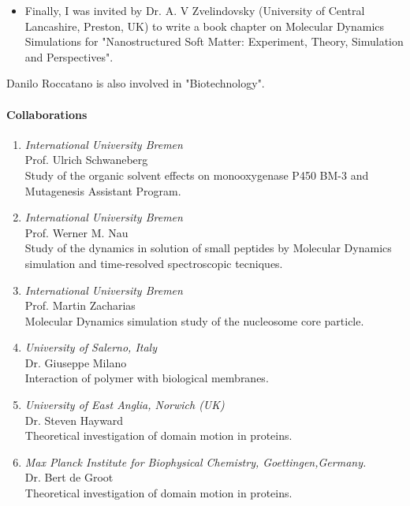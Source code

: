 \begin{itemize}
\item{} Finally, I was invited by Dr. A. V Zvelindovsky (University of Central Lancashire, Preston, UK)  
to write a book chapter on Molecular Dynamics Simulations for "Nanostructured Soft 
Matter: Experiment, Theory, Simulation and Perspectives". \cite{Roccatano06b}

\end{itemize}

\nocite{Schenk06,Wong06,Wong06b,Roccatano06a}
Danilo Roccatano is also involved in "Biotechnology".


\paragraph{Collaborations}
\begin{enumerate}
\item {\sl International University Bremen} \\ Prof. Ulrich Schwaneberg \\ Study of 
the organic solvent effects on
monooxygenase P450 BM-3 and Mutagenesis Assistant Program.
\item {\sl International University Bremen} \\ Prof. Werner M. Nau \\ Study of the 
dynamics in solution of small 
peptides by Molecular Dynamics simulation and time-resolved spectroscopic 
tecniques.
\item {\sl International University Bremen} \\ Prof. Martin Zacharias \\ Molecular 
Dynamics simulation study of the nucleosome core particle.
\item {\sl University of Salerno, Italy} \\ Dr. Giuseppe Milano \\ Interaction of 
polymer with biological membranes.
\item {\sl University of East Anglia, Norwich (UK)} \\ Dr. Steven Hayward \\ Theoretical 
investigation of domain motion in proteins.
\item {\sl Max Planck Institute for Biophysical Chemistry, Goettingen,Germany. } \\ 
Dr. Bert de Groot \\ Theoretical investigation of domain motion in proteins.
\end{enumerate}



